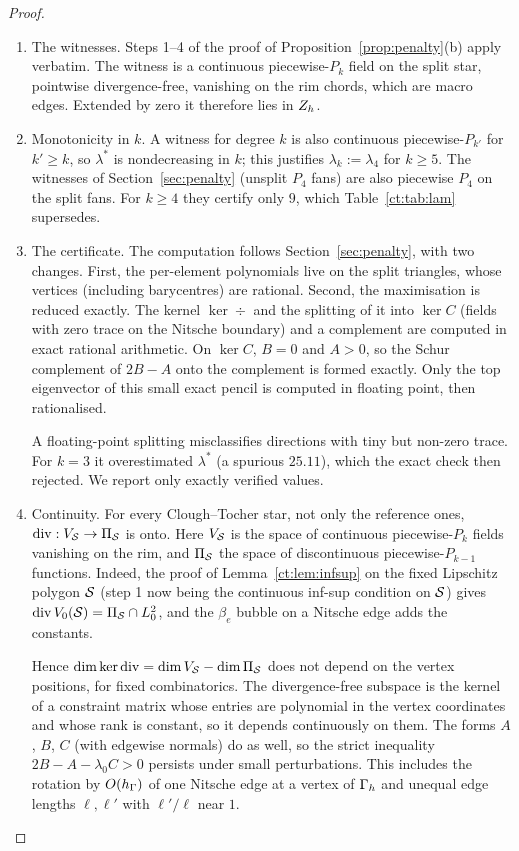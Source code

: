 \begin{proof}
\begin{enumerate}
\item The witnesses. Steps 1--4 of the proof of Proposition~\ref{prop:penalty}(b) apply verbatim. The witness is a continuous piecewise-$P_k$ field on the split star, pointwise divergence-free, vanishing on the rim chords, which are macro edges. Extended by zero it therefore lies in $Z_h$.
\item Monotonicity in $k$. A witness for degree $k$ is also continuous piecewise-$P_{k'}$ for $k'\ge k$, so $\lambda^\ast$ is nondecreasing in $k$; this justifies $\lambda_k:=\lambda_4$ for $k\ge5$. The witnesses of Section~\ref{sec:penalty} (unsplit $P_4$ fans) are also piecewise $P_4$ on the split fans. For $k\ge4$ they certify only $9$, which Table~\ref{ct:tab:lam} supersedes.
\item The certificate. The computation follows Section~\ref{sec:penalty}, with two changes. First, the per-element polynomials live on the split triangles, whose vertices (including barycentres) are rational. Second, the maximisation is reduced exactly. The kernel $\ker\div$ and the splitting of it into $\ker C$ (fields with zero trace on the Nitsche boundary) and a complement are computed in exact rational arithmetic. On $\ker C$, $B=0$ and $A>0$, so the Schur complement of $2B-A$ onto the complement is formed exactly. Only the top eigenvector of this small exact pencil is computed in floating point, then rationalised.

A floating-point splitting misclassifies directions with tiny but non-zero trace. For $k=3$ it overestimated $\lambda^\ast$ (a spurious $25.11$), which the exact check then rejected. We report only exactly verified values.
\item Continuity. For every Clough--Tocher star, not only the reference ones, $\operatorname{div}:V_\mathcal S\to\Pi_\mathcal S$ is onto. Here $V_\mathcal S$ is the space of continuous piecewise-$P_k$ fields vanishing on the rim, and $\Pi_\mathcal S$ the space of discontinuous piecewise-$P_{k-1}$ functions. Indeed, the proof of Lemma~\ref{ct:lem:infsup} on the fixed Lipschitz polygon $\mathcal S$ (step 1 now being the continuous inf-sup condition on $\mathcal S$) gives $\operatorname{div} V_0(\mathcal S)=\Pi_\mathcal S\cap L^2_0$, and the $\beta_e$ bubble on a Nitsche edge adds the constants.

Hence $\dim\ker\operatorname{div}=\dim V_\mathcal S-\dim\Pi_\mathcal S$ does not depend on the vertex positions, for fixed combinatorics. The divergence-free subspace is the kernel of a constraint matrix whose entries are polynomial in the vertex coordinates and whose rank is constant, so it depends continuously on them. The forms $A$, $B$, $C$ (with edgewise normals) do as well, so the strict inequality $2B-A-\lambda_0C>0$ persists under small perturbations. This includes the rotation by $O(h_\Gamma)$ of one Nitsche edge at a vertex of $\Gamma_h$ and unequal edge lengths $\ell,\ell'$ with $\ell'/\ell$ near $1$.\qedhere
\end{enumerate}
\end{proof}

